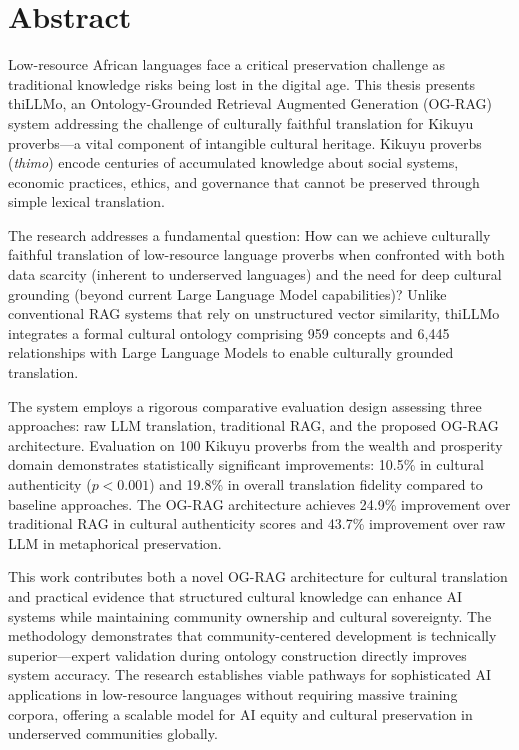 \documentclass[12pt]{report}
\begin{document}
\chapter*{Abstract}
Low-resource African languages face a critical preservation challenge as traditional knowledge risks being lost in the digital age. This thesis presents thiLLMo, an Ontology-Grounded Retrieval Augmented Generation (OG-RAG) system addressing the challenge of culturally faithful translation for Kikuyu proverbs—a vital component of intangible cultural heritage. Kikuyu proverbs (\emph{thimo}) encode centuries of accumulated knowledge about social systems, economic practices, ethics, and governance that cannot be preserved through simple lexical translation.

The research addresses a fundamental question: How can we achieve culturally faithful translation of low-resource language proverbs when confronted with both data scarcity (inherent to underserved languages) and the need for deep cultural grounding (beyond current Large Language Model capabilities)? Unlike conventional RAG systems that rely on unstructured vector similarity, thiLLMo integrates a formal cultural ontology comprising 959 concepts and 6,445 relationships with Large Language Models to enable culturally grounded translation.

The system employs a rigorous comparative evaluation design assessing three approaches: raw LLM translation, traditional RAG, and the proposed OG-RAG architecture. Evaluation on 100 Kikuyu proverbs from the wealth and prosperity domain demonstrates statistically significant improvements: 10.5\% in cultural authenticity ($p < 0.001$) and 19.8\% in overall translation fidelity compared to baseline approaches. The OG-RAG architecture achieves 24.9\% improvement over traditional RAG in cultural authenticity scores and 43.7\% improvement over raw LLM in metaphorical preservation.

This work contributes both a novel OG-RAG architecture for cultural translation and practical evidence that structured cultural knowledge can enhance AI systems while maintaining community ownership and cultural sovereignty. The methodology demonstrates that community-centered development is technically superior—expert validation during ontology construction directly improves system accuracy. The research establishes viable pathways for sophisticated AI applications in low-resource languages without requiring massive training corpora, offering a scalable model for AI equity and cultural preservation in underserved communities globally.
\end{document}
